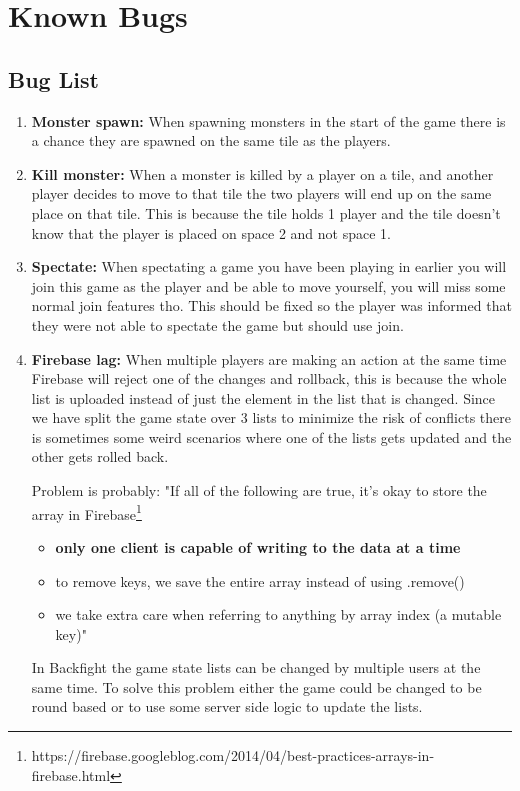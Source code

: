 \pagestyle{Uni}

\chapter{Known Bugs}

\section{Bug List}

\begin{enumerate}
	\item \textbf{Monster spawn:} When spawning monsters in the start of the game there is a chance they are spawned on the same tile as the players.
	
	\item \textbf{Kill monster:} When a monster is killed by a player on a tile, and another player decides to move to that tile the two players will end up on the same place on that tile. This is because the tile holds 1 player and the tile doesn't know that the player is placed on space 2 and not space 1.
		
	\item \textbf{Spectate:} When spectating a game you have been playing in earlier you will join this game as the player and be able to move yourself, you will miss some normal join features tho. This should be fixed so the player was informed that they were not able to spectate the game but should use join. 

	\item \textbf{Firebase lag:} When multiple players are making an action at the same time Firebase will reject one of the changes and rollback, this is because the whole list is uploaded instead of just the element in the list that is changed. Since we have split the game state over 3 lists to minimize the risk of conflicts there is sometimes some weird scenarios where one of the lists gets updated and the other gets rolled back.
	
	Problem is probably: "If all of the following are true, it's okay to store the array in Firebase\footnote{https://firebase.googleblog.com/2014/04/best-practices-arrays-in-firebase.html}
	
	\begin{itemize}
		\item \textbf{only one client is capable of writing to the data at a time}
		\item to remove keys, we save the entire array instead of using .remove()
		\item we take extra care when referring to anything by array index (a mutable key)"
	\end{itemize}
	In Backfight the game state lists can be changed by multiple users at the same time. To solve this problem either the game could be changed to be round based or to use some server side logic to update the lists.
	
\end{enumerate}